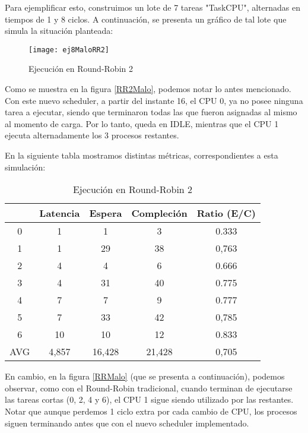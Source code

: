 Para ejemplificar esto, construimos un lote de 7 tareas "TaskCPU", alternadas en tiempos de 1 y 8 ciclos. A continuación, se presenta un gráfico de tal lote que simula la situación planteada:

\clearpage
    \begin{figure}[h]
        \texttt{[image: ej8MaloRR2]}
        \caption{Ejecución en Round-Robin 2}
    \end{figure}
Como se muestra en la figura \ref{RR2Malo}, podemos notar lo antes mencionado. Con este nuevo scheduler, a partir del instante 16, el CPU 0, ya no posee ninguna tarea a ejecutar, siendo que terminaron todas las que fueron asignadas al mismo al momento de carga. Por lo tanto, queda en IDLE, mientras que el CPU 1 ejecuta alternadamente los 3 procesos restantes.

En la siguiente tabla mostramos distintas métricas, correspondientes a esta simulación:
\begin{table}[h]
  \caption{Ejecución en Round-Robin 2}
  \centering
    \begin{tabular}{c c c c c}
    \hline
          & Latencia & Espera & Compleción & Ratio (E/C) \\
    \hline
        0 &     1    &    1   &      3     &     0.333   \\
        1 &     1    &   29   &     38     &     0,763   \\
        2 &     4    &    4   &      6     &     0.666   \\
        3 &     4    &   31   &     40     &     0.775   \\
        4 &     7    &    7   &      9     &     0.777   \\
        5 &     7    &   33   &     42     &     0,785   \\
        6 &     10   &   10   &     12     &     0.833   \\
        AVG & 4,857  & 16,428 &   21,428   &     0,705   \\
    \end{tabular}
\end{table}


En cambio, en la figura \ref{RRMalo} (que se presenta a continuación), podemos observar, como con el Round-Robin tradicional, cuando terminan de ejecutarse las tareas cortas (0, 2, 4 y 6), el CPU 1 sigue siendo utilizado por las restantes. Notar que aunque perdemos 1 ciclo extra por cada cambio de CPU, los procesos siguen terminando antes que con el nuevo scheduler implementado.

